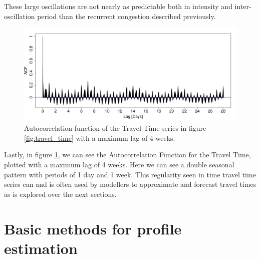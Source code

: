 \documentclass[letterpaper, 10 pt, conference]{ieeeconf}  %
\begin{document}
These large oscillations are not nearly as predictable both in intensity and inter-oscillation period than the recurrent congestion described previously.
\begin{figure}[htbp]
	\centerline{\includegraphics[width=\linewidth]{./images/ACF_M6_Link3.pdf}}
	\caption{Autocorrelation function of the Travel Time series in figure \ref{fig:travel_time} with a maximum lag of 4 weeks.}
	\label{fig:ACF}
\end{figure}
Lastly, in figure \ref{fig:ACF}, we can see the Autocorrelation Function for the Travel Time, plotted with a maximum lag of 4 weeks. Here we can see a double seasonal pattern with periods of 1 day and 1 week.
This regularity seen in time travel time series can and is often used by modellers to approximate and forecast travel times as is explored over the next sections.
\section{Basic methods for profile estimation}\label{Basic methods for profile estimation}
\end{document}

